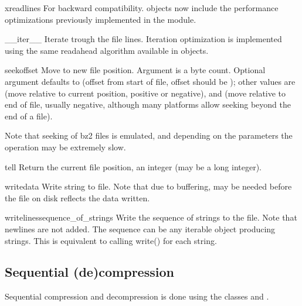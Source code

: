 \begin{methoddesc}[BZ2File]{xreadlines}{}
For backward compatibility.  objects now include the
performance optimizations previously implemented in the 
module.
\end{methoddesc}

\begin{methoddesc}[BZ2File]{\_\_iter\_\_}{}
Iterate trough the file lines. Iteration optimization is implemented
using the same readahead algorithm available in  objects.
\end{methoddesc}

\begin{methoddesc}[BZ2File]{seek}{offset }
Move to new file position. Argument  is a byte count. Optional
argument  defaults to  (offset from start of file,
offset should be ); other values are  (move relative to
current position, positive or negative), and  (move relative to end
of file, usually negative, although many platforms allow seeking beyond
the end of a file).

Note that seeking of bz2 files is emulated, and depending on the parameters
the operation may be extremely slow.
\end{methoddesc}

\begin{methoddesc}[BZ2File]{tell}{}
Return the current file position, an integer (may be a long integer).
\end{methoddesc}

\begin{methoddesc}[BZ2File]{write}{data}
Write string  to file. Note that due to buffering, 
may be needed before the file on disk reflects the data written.
\end{methoddesc}

\begin{methoddesc}[BZ2File]{writelines}{sequence_of_strings}
Write the sequence of strings to the file. Note that newlines are not added.
The sequence can be any iterable object producing strings. This is equivalent
to calling write() for each string.
\end{methoddesc}


\subsection{Sequential (de)compression}

Sequential compression and decompression is done using the classes
 and .

